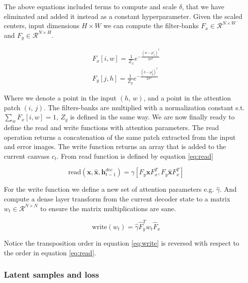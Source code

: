 \noindent The above equations included terms to compute and scale $\delta$, that we have eliminated and added it instead as a constant hyperparameter. Given the scaled centers, input dimensions $H \times W$ we can compute the filter-banks $F_x \in \mathcal{R}^{N \times W}$ and $F_y \in \mathcal{R}^{N \times H}$. 

\begin{align}
F_x [i, w] = \frac{1}{Z_x}e^{-\frac{(w - \mu_x^i)^2}{2\sigma^2}} \\
F_y [j, h] = \frac{1}{Z_y}e^{-\frac{(h - \mu_y^j)^2}{2\sigma^2}}
\end{align}

\noindent Where we denote a point in the input $(h,\, w)$, and a point in the attention patch $(i,\, j)$. The filters-banks are multiplied with a normalization constant s.t. $\sum_w F_x[i, w] = 1$, $Z_y$ is defined in the same way. We are now finally ready to define the read and write functions with attention parameters. The read operation returns a concatenation of the same patch extracted from the input and error images. The write function returns an array that is added to the current canvass $c_t$. From \citet{Gregor2015} read function is defined by equation \ref{eq:read}

\begin{equation}\label{eq:read}
\text{read}(\mathbf{x}, \mathbf{\hat{x}}, \mathbf{h}_{t-1}^{dec}) = \gamma[F_y \mathbf{x} F_x^T, F_y \mathbf{\hat{x}} F_x^T]
\end{equation} 

\noindent For the write function we define a new set of attention parameters e.g. $\hat{\gamma}$. And compute a dense layer transform from the current decoder state to a matrix $w_t \in \mathcal{R}^{N \times N}$ to ensure the matrix multiplications are sane. 

\begin{equation}\label{eq:write}
\text{write}(w_t)  = \hat{\gamma} \hat{F}^T_y w_t \hat{F}_x
\end{equation}

\noindent Notice the transposition order in equation \ref{eq:write} is reversed with respect to the order in equation \ref{eq:read}. 


\subsubsection{Latent samples and loss}

